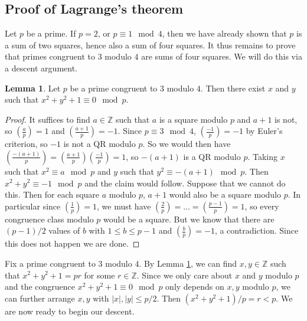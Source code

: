 \documentclass{article}
\newcommand{\Z}{\mathbb{Z}}
\newcommand{\rb}[1]{\left( #1 \right)}
\newcommand{\abs}[1]{\left\lvert #1 \right\rvert}
\newcommand{\legendre}[2]{\rb{\tfrac{#1}{#2}}}
\theoremstyle{definition}\newtheorem{definition}{Definition}
\theoremstyle{definition}\newtheorem{remark}[definition]{Remark}
\theoremstyle{definition}\newtheorem*{example}{Example}
\theoremstyle{definition}\newtheorem*{note}{Note}
\newtheorem{lemma}[definition]{Lemma}
\begin{document}
\subsection{Proof of Lagrange's theorem}

Let $ p $ be a prime. If $ p = 2 $, or $ p \equiv 1 \mod 4 $, then we have already shown that $ p $ is a sum of two squares, hence also a sum of four squares. It thus remains to prove that primes congruent to $ 3 $ modulo $ 4 $ are sums of four squares. We will do this via a descent argument.


\begin{lemma}
\label{lem:54}
Let $ p $ be a prime congruent to $ 3 $ modulo $ 4 $. Then there exist $ x $ and $ y $ such that $ x^2 + y^2 + 1 \equiv 0 \mod p $.
\end{lemma}

\begin{proof}
It suffices to find $ a \in \Z $ such that $ a $ is a square modulo $ p $ and $ a + 1 $ is not, so $ \legendre{a}{p} = 1 $ and $ \legendre{a + 1}{p} = -1 $. Since $ p \equiv 3 \mod 4 $, $ \legendre{-1}{p} = -1 $ by Euler's criterion, so $ -1 $ is not a QR modulo $ p $. So we would then have $ \legendre{-\rb{a + 1}}{p} = \legendre{a + 1}{p}\legendre{-1}{p} = 1 $, so $ -\rb{a + 1} $ is a QR modulo $ p $. Taking $ x $ such that $ x^2 \equiv a \mod p $ and $ y $ such that $ y^2 \equiv -\rb{a + 1} \mod p $. Then $ x^2 + y^2 \equiv -1 \mod p $ and the claim would follow. Suppose that we cannot do this. Then for each square $ a $ modulo $ p $, $ a + 1 $ would also be a square modulo $ p $. In particular since $ \legendre{1}{p} = 1 $, we must have $ \legendre{2}{p} = \dots = \legendre{p - 1}{p} = 1 $, so every congruence class modulo $ p $ would be a square. But we know that there are $ \rb{p - 1} / 2 $ values of $ b $ with $ 1 \le b \le p - 1 $ and $ \legendre{b}{p} = -1 $, a contradiction. Since this does not happen we are done.
\end{proof}

Fix a prime congruent to $ 3 $ modulo $ 4 $. By Lemma \ref{lem:54}, we can find $ x, y \in \Z $ such that $ x^2 + y^2 + 1 = pr $ for some $ r \in \Z $. Since we only care about $ x $ and $ y $ modulo $ p $ and the congruence $ x^2 + y^2 + 1 \equiv 0 \mod p $ only depends on $ x, y $ modulo $ p $, we can further arrange $ x, y $ with $ \abs{x}, \abs{y} \le p / 2 $. Then $ \rb{x^2 + y^2 + 1} / p = r < p $. We are now ready to begin our descent.
\end{document}
